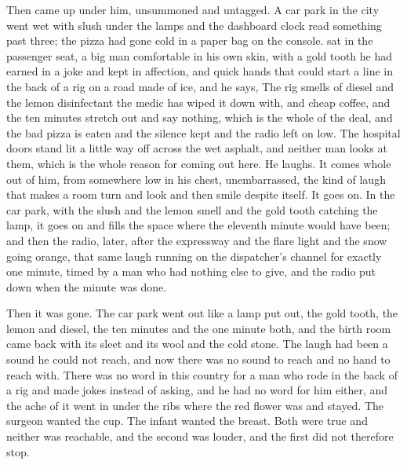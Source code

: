 Then  came up under him, unsummoned and untagged. A car park in the city went wet with slush under the lamps and the dashboard clock read something past three; the pizza had gone cold in a paper bag on the console.  sat in the passenger seat, a big man comfortable in his own skin, with a gold tooth he had earned in a joke and kept in affection, and quick hands that could start a line in the back of a rig on a road made of ice, and he says,  The rig smells of diesel and the lemon disinfectant the medic has wiped it down with, and cheap coffee, and the ten minutes stretch out and say nothing, which is the whole of the deal, and the bad pizza is eaten and the silence kept and the radio left on low. The hospital doors stand lit a little way off across the wet asphalt, and neither man looks at them, which is the whole reason for coming out here. He laughs. It comes whole out of him, from somewhere low in his chest, unembarrassed, the kind of laugh that makes a room turn and look and then smile despite itself. It goes on. In the car park, with the slush and the lemon smell and the gold tooth catching the lamp, it goes on and fills the space where the eleventh minute would have been; and then the radio, later, after the expressway and the flare light and the snow going orange, that same laugh running on the dispatcher's channel for exactly one minute, timed by a man who had nothing else to give, and the radio put down when the minute was done.

Then it was gone. The car park went out like a lamp put out, the gold tooth, the lemon and diesel, the ten minutes and the one minute both, and the birth room came back with its sleet and its wool and the cold stone. The laugh had been a sound he could not reach, and now there was no sound to reach and no hand to reach with. There was no word in this country for a man who rode in the back of a rig and made jokes instead of asking, and he had no word for him either, and the ache of it went in under the ribs where the red flower was and stayed. The surgeon wanted the cup. The infant wanted the breast. Both were true and neither was reachable, and the second was louder, and the first did not therefore stop.

\scenebreak

